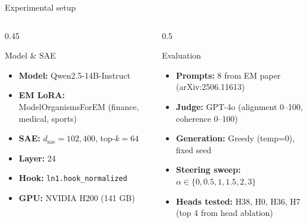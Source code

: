 \documentclass[aspectratio=169]{beamer}
\begin{document}
\begin{frame}{Experimental setup}
\begin{columns}
\begin{column}{0.45\textwidth}
\begin{block}{Model \& SAE}
\begin{itemize}
    \item \textbf{Model:} Qwen2.5-14B-Instruct
    \item \textbf{EM LoRA:} ModelOrganismsForEM (finance, medical, sports)
    \item \textbf{SAE:} $d_{\text{sae}} = 102{,}400$, top-$k = 64$
    \item \textbf{Layer:} 24
    \item \textbf{Hook:} \texttt{ln1.hook\_normalized}
    \item \textbf{GPU:} NVIDIA H200 (141 GB)
\end{itemize}
\end{block}
\end{column}
\begin{column}{0.5\textwidth}
\begin{block}{Evaluation}
\begin{itemize}
    \item \textbf{Prompts:} 8 from EM paper (arXiv:2506.11613)
    \item \textbf{Judge:} GPT-4o (alignment 0--100, coherence 0--100)
    \item \textbf{Generation:} Greedy (temp=0), fixed seed
    \item \textbf{Steering sweep:} $\alpha \in \{0, 0.5, 1, 1.5, 2, 3\}$
    \item \textbf{Heads tested:} H38, H0, H36, H7 (top 4 from head ablation)
\end{itemize}
\end{block}
\end{column}
\end{columns}
\end{frame}
\end{document}
